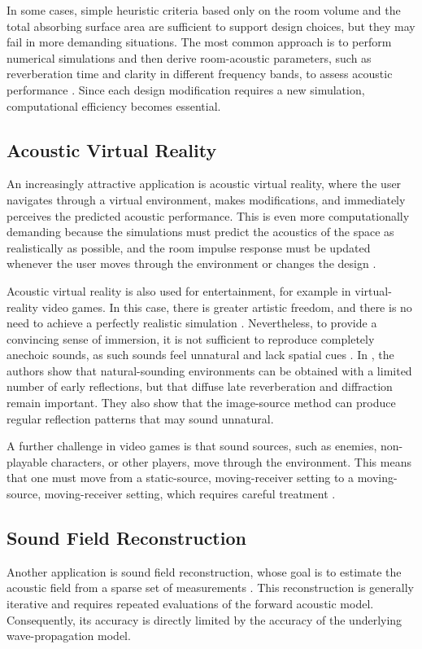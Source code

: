 \documentclass{Configuration_Files/PoliMi3i_thesis}
\begin{document}
In some cases, simple heuristic criteria based only on the room volume and the total absorbing surface area are sufficient to support design choices, but they may fail in more demanding situations. The most common approach is to perform numerical simulations and then derive room-acoustic parameters, such as reverberation time and clarity in different frequency bands, to assess acoustic performance \citep{iso_acoustics_2009,kuttruff_room_2009}. Since each design modification requires a new simulation, computational efficiency becomes essential.

\subsection{Acoustic Virtual Reality}
An increasingly attractive application is acoustic virtual reality, where the user navigates through a virtual environment, makes modifications, and immediately perceives the predicted acoustic performance. This is even more computationally demanding because the simulations must predict the acoustics of the space as realistically as possible, and the room impulse response must be updated whenever the user moves through the environment or changes the design \citep{savioja_creating_1999,pind_acoustic_2018}.

Acoustic virtual reality is also used for entertainment, for example in virtual-reality video games. In this case, there is greater artistic freedom, and there is no need to achieve a perfectly realistic simulation \citep{pind_acoustic_2018}. Nevertheless, to provide a convincing sense of immersion, it is not sufficient to reproduce completely anechoic sounds, as such sounds feel unnatural and lack spatial cues \citep{isserstedt_effect_2024}. In \cite{fichna_evaluation_2023}, the authors show that natural-sounding environments can be obtained with a limited number of early reflections, but that diffuse late reverberation and diffraction remain important. They also show that the image-source method can produce regular reflection patterns that may sound unnatural.

A further challenge in video games is that sound sources, such as enemies, non-playable characters, or other players, move through the environment. This means that one must move from a static-source, moving-receiver setting to a moving-source, moving-receiver setting, which requires careful treatment \citep{chandak_efficient_2011}.

\subsection{Sound Field Reconstruction}
Another application is sound field reconstruction, whose goal is to estimate the acoustic field from a sparse set of measurements \citep{olivieri_physics-informed_2024}. This reconstruction is generally iterative and requires repeated evaluations of the forward acoustic model. Consequently, its accuracy is directly limited by the accuracy of the underlying wave-propagation model.
\end{document}

